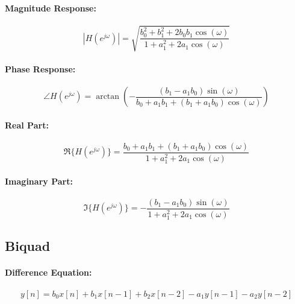 \paragraph{Magnitude Response:}
\begin{equation}
 |H(e^{j \omega})| = \sqrt{\frac{b_0^2 + b_1^2 + 2 b_0 b_1 \cos (\omega)}{1 + a_1^2 + 2 a_1 \cos (\omega)}}
\end{equation}

\paragraph{Phase Response:}
\begin{equation}
 \angle H(e^{j \omega}) = \arctan \left(- \frac{(b_1 - a_1 b_0) \sin (\omega)}
                                               {b_0 + a_1 b_1 + (b_1 + a_1 b_0) \cos (\omega)} \right)
\end{equation}

\paragraph{Real Part:}
\begin{equation}
 \Re \{ H(e^{j \omega}) \} = \frac{b_0 + a_1 b_1 + (b_1 + a_1 b_0) \cos (\omega) }
                                  {1 + a_1^2 + 2 a_1 \cos (\omega)}
\end{equation}

\paragraph{Imaginary Part:}
\begin{equation}
 \Im \{ H(e^{j \omega}) \} = - \frac{(b_1 - a_1 b_0) \sin (\omega) }
                                    {1 + a_1^2 + 2 a_1 \cos (\omega)}
\end{equation}



\subsection{Biquad}

\paragraph{Difference Equation:}
\begin{equation}
 y[n] = b_0 x[n] + b_1 x[n-1] + b_2 x[n-2] - a_1 y[n-1] - a_2 y[n-2]
\end{equation}

